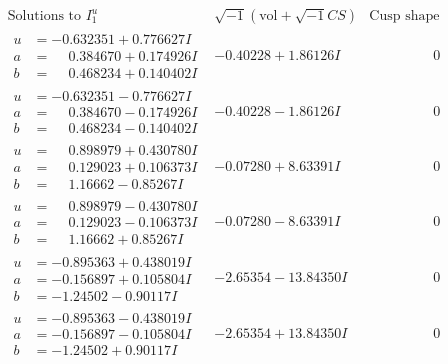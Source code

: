 \documentclass[1p]{elsarticle_modified}
\theoremstyle{definition}
\newcommand{\I}{\sqrt{-1}}
\begin{document}
$$\begin{array}{c|c|c}  
\text{Solutions to }I^u_{1}& \I (\text{vol} + \sqrt{-1}CS) & \text{Cusp shape}\\
 \hline 
\begin{aligned}
u &= -0.632351 + 0.776627 I \\
a &= \phantom{-}0.384670 + 0.174926 I \\
b &= \phantom{-}0.468234 + 0.140402 I\end{aligned}
 & -0.40228 + 1.86126 I & \phantom{-0.000000 } 0 \\ \hline\begin{aligned}
u &= -0.632351 - 0.776627 I \\
a &= \phantom{-}0.384670 - 0.174926 I \\
b &= \phantom{-}0.468234 - 0.140402 I\end{aligned}
 & -0.40228 - 1.86126 I & \phantom{-0.000000 } 0 \\ \hline\begin{aligned}
u &= \phantom{-}0.898979 + 0.430780 I \\
a &= \phantom{-}0.129023 + 0.106373 I \\
b &= \phantom{-}1.16662 - 0.85267 I\end{aligned}
 & -0.07280 + 8.63391 I & \phantom{-0.000000 } 0 \\ \hline\begin{aligned}
u &= \phantom{-}0.898979 - 0.430780 I \\
a &= \phantom{-}0.129023 - 0.106373 I \\
b &= \phantom{-}1.16662 + 0.85267 I\end{aligned}
 & -0.07280 - 8.63391 I & \phantom{-0.000000 } 0 \\ \hline\begin{aligned}
u &= -0.895363 + 0.438019 I \\
a &= -0.156897 + 0.105804 I \\
b &= -1.24502 - 0.90117 I\end{aligned}
 & -2.65354 - 13.84350 I & \phantom{-0.000000 } 0 \\ \hline\begin{aligned}
u &= -0.895363 - 0.438019 I \\
a &= -0.156897 - 0.105804 I \\
b &= -1.24502 + 0.90117 I\end{aligned}
 & -2.65354 + 13.84350 I & \phantom{-0.000000 } 0 \\ \hline\begin{aligned}

\end{aligned}
\end{array}$$
\end{document}

